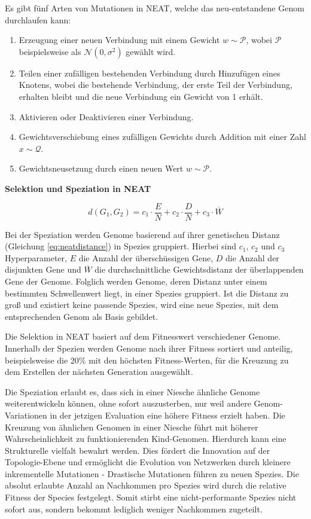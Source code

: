 Es gibt fünf Arten von Mutationen in NEAT, welche das neu-entstandene Genom durchlaufen kann:
\begin{enumerate}
	\item Erzeugung einer neuen Verbindung mit einem Gewicht $w \sim \mathcal{P}$, wobei $\mathcal{P}$ beispielsweise als $\mathcal{N}(0, \sigma^2)$ gewählt wird.
	\item Teilen einer zufälligen bestehenden Verbindung durch Hinzufügen eines Knotens, wobei die bestehende Verbindung, der erste Teil der Verbindung, erhalten bleibt und die neue Verbindung ein Gewicht von 1 erhält.
	\item Aktivieren oder Deaktivieren einer Verbindung.
	\item Gewichtsverschiebung eines zufälligen Gewichts durch Addition mit einer Zahl $x \sim \mathcal{Q}$.
	\item Gewichtsneusetzung durch einen neuen Wert $w \sim \mathcal{P}$.
\end{enumerate}

\textbf{Selektion und Speziation in NEAT}

\begin{equation}
d(G_1, G_2) = c_1 \cdot \frac{E}{N} + c_2 \cdot \frac{D}{N} + c_3 \cdot \overline{W}
\label{eq:neatdistance}
\end{equation}

Bei der Speziation werden Genome basierend auf ihrer genetischen Distanz (Gleichung \ref{eq:neatdistance}) in Spezies gruppiert. Hierbei sind $c_1$, $c_2$ und  $c_3$ Hyperparameter, $E$ die Anzahl der überschüssigen Gene, $D$ die Anzahl der disjunkten Gene und $\overline{W}$ die durchschnittliche Gewichtsdistanz der überlappenden Gene der Genome. Folglich werden Genome, deren Distanz unter einem bestimmten Schwellenwert liegt, in einer Spezies gruppiert. Ist die Distanz zu groß und existiert keine passende Spezies, wird eine neue Spezies, mit dem entsprechenden Genom als Basis gebildet. 


Die Selektion in NEAT basiert auf dem Fitnesswert verschiedener Genome. Innerhalb der Spezien werden Genome nach ihrer Fitness sortiert und anteilig, beispielsweise die 20\% mit den höchsten Fitness-Werten, für die Kreuzung zu dem Erstellen der nächsten Generation ausgewählt. 


Die Speziation erlaubt es, dass sich in einer Niesche ähnliche Genome weiterentwickeln können, ohne sofort auszusterben, nur weil andere Genom-Variationen in der jetzigen Evaluation eine höhere Fitness erzielt haben. Die Kreuzung von ähnlichen Genomen in einer Niesche führt mit höherer Wahrscheinlichkeit zu funktionierenden Kind-Genomen. Hierdurch kann eine Strukturelle vielfalt bewahrt werden. Dies fördert die Innovation auf der Topologie-Ebene und ermöglicht die Evolution von Netzwerken durch kleinere inkrementelle Mutationen - Drastische Mutationen führen zu neuen Spezies. Die absolut erlaubte Anzahl an Nachkommen pro Spezies wird durch die relative Fitness der Species festgelegt. Somit stirbt eine nicht-performante Spezies nicht sofort aus, sondern bekommt lediglich weniger Nachkommen zugeteilt.

